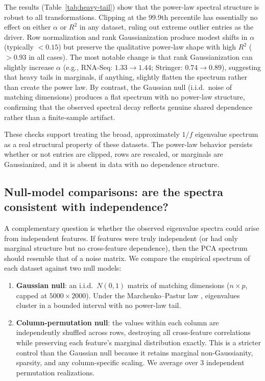 The results (Table~\ref{tab:heavy-tail}) show that the power-law spectral
structure is robust to all transformations.
Clipping at the 99.9th percentile has essentially no effect on either $\alpha$
or $R^2$ in any dataset, ruling out extreme outlier entries as the driver.
Row normalization and rank Gaussianization produce modest shifts in $\alpha$
(typically $< 0.15$) but preserve the qualitative power-law shape with high
$R^2$ ($> 0.93$ in all cases).
The most notable change is that rank Gaussianization can slightly increase
$\alpha$ (e.g., RNA-Seq: $1.33 \to 1.44$; Stringer: $0.74 \to 0.89$),
suggesting that heavy tails in marginals, if anything, slightly flatten the
spectrum rather than create the power law.
By contrast, the Gaussian null (i.i.d.\ noise of matching dimensions) produces a
flat spectrum with no power-law structure, confirming that the observed spectral
decay reflects genuine shared dependence rather than a finite-sample artifact.

These checks support treating the broad, approximately $1/f$ eigenvalue spectrum
as a real structural property of these datasets.
The power-law behavior persists whether or not entries are clipped, rows are
rescaled, or marginals are Gaussianized, and it is absent in data with no
dependence structure.

\subsection{Null-model comparisons: are the spectra consistent with independence?}
\label{app:null-models}

A complementary question is whether the observed eigenvalue spectra could arise
from independent features.
If features were truly independent (or had only marginal structure but no
cross-feature dependence), then the PCA spectrum should resemble that of a noise
matrix.
We compare the empirical spectrum of each dataset against two null models:

\begin{enumerate}
\item \textbf{Gaussian null}: an i.i.d.\ $N(0,1)$ matrix of matching dimensions
  ($n \times p$, capped at $5000 \times 2000$).
  Under the Marchenko--Pastur law \citep{marchenko1967}, eigenvalues cluster in a bounded interval
  with no power-law tail.
\item \textbf{Column-permutation null}: the values within each column are
  independently shuffled across rows, destroying all cross-feature correlations
  while preserving each feature's marginal distribution exactly.
  This is a stricter control than the Gaussian null because it retains marginal
  non-Gaussianity, sparsity, and any column-specific scaling.
  We average over 3 independent permutation realizations.
\end{enumerate}

